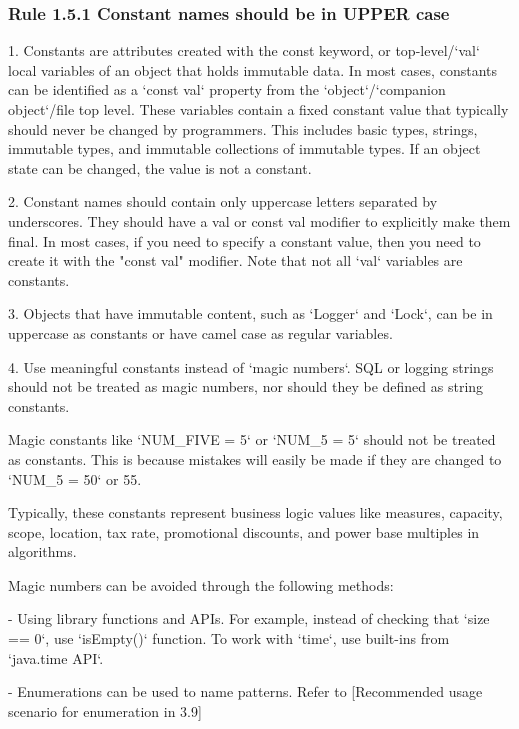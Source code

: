 \subsubsection*{\textbf{Rule 1.5.1 Constant names should be in UPPER case}}
\leavevmode\newline



1.	Constants are attributes created with the const keyword, or top-level/`val` local variables of an object that holds immutable data. In most cases, constants can be identified as a `const val` property from the `object`/`companion object`/file top level. These variables contain a fixed constant value that typically should never be changed by programmers. This includes basic types, strings, immutable types, and immutable collections of immutable types. If an object state can be changed, the value is not a constant.



2. Constant names should contain only uppercase letters separated by underscores. They should have a val or const val modifier to explicitly make them final. In most cases, if you need to specify a constant value, then you need to create it with the "const val" modifier. Note that not all `val` variables are constants.



3. Objects that have immutable content, such as `Logger` and `Lock`, can be in uppercase as constants or have camel case as regular variables.



4. Use meaningful constants instead of `magic numbers`. SQL or logging strings should not be treated as magic numbers, nor should they be defined as string constants.

Magic constants like `NUM\_FIVE = 5` or `NUM\_5 = 5` should not be treated as constants. This is because mistakes will easily be made if they are changed to `NUM\_5 = 50` or 55.

Typically, these constants represent business logic values like measures, capacity, scope, location, tax rate, promotional discounts, and power base multiples in algorithms.

Magic numbers can be avoided through the following methods:

- Using library functions and APIs. For example, instead of checking that `size == 0`, use `isEmpty()` function. To work with `time`, use built-ins from `java.time API`.

- Enumerations can be used to name patterns. Refer to [Recommended usage scenario for enumeration in 3.9]



